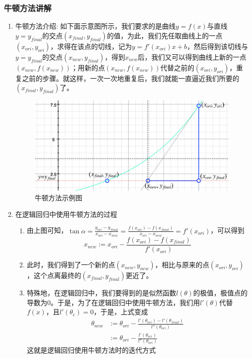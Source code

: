 \subsubsection{牛顿方法讲解}
\begin{enumerate}
	\item 牛顿方法介绍: 如下面示意图所示，我们要求的是曲线$y=f(x)$与直线$y=y_{final}$的交点$(x_{final}, y_{final})$的值，为此，我们先任取曲线上的一点$(x_{ori}, y_{ori})$，求得在该点的切线，记为$y=f'(x_{ori})x + b$，然后得到该切线与$y=y_{final}$的交点$(x_{new}, y_{final})$，得到$x_{new}$后，我们又可以得到曲线上新的一点$(x_{new}, f(x_{new}))$；用新的点$(x_{new}, f(x_{new}))$代替之前的$(x_{ori}, y_{ori})$，重复之前的步骤。就这样，一次一次地重复后，我们就能一直逼近我们所要的$(x_{final}, y_{final})$了。
	\begin{figure}[htbp]
		\centering
		\includegraphics[scale=0.9]{contents/牛顿方法示例图片}
		\caption{牛顿方法示例图}
	\end{figure}

	\item 在逻辑回归中使用牛顿方法的过程
	\begin{enumerate}
		\item 由上图可知，$\tan\alpha = \frac{y_{ori}-y_{final}}{x_{ori}-x_{new}} = \frac{f(x_{ori})-f(x_{final})}{x_{ori}-x_{new}} = f'(x_{ori})$，可以得到
		\begin{equation}
			x_{new} := x_{ori} - \frac{f(x_{ori})-f(x_{final})}{f'(x_{ori})}
		\end{equation}
		
		\item 此时，我们得到了一个新的点$(x_{new}, y_{new})$，相比与原来的点$(x_{ori},y_{ori})$，这个点离最终的$(x_{final}, y_{final})$更近了。

		\item 特殊地，在逻辑回归中，我们要得到的是似然函数$l(\theta)$的极值，极值点的导数为$0$。于是，为了在逻辑回归中使用牛顿方法，我们用$l'(\theta)$代替$f(x)$，且$l'(\theta_c) = 0$，于是，上式变成
		\begin{align}
			\theta_{new} &:= \theta_{ori} - \frac{l'(\theta_{ori})-l'(\theta_{final})}{l''(\theta_{ori})} \\
			&:=  \theta_{ori} - \frac{l'(\theta_{ori})}{l''(\theta_{ori})}
		\end{align}
		这就是逻辑回归使用牛顿方法时的迭代方式
	\end{enumerate}


\end{enumerate}
